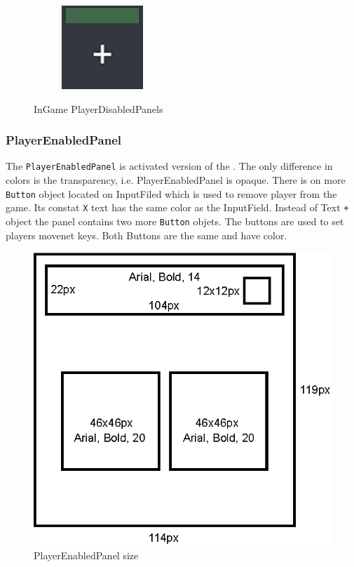 \begin{figure}[h!]
\begin{subfigure}{0.185\textwidth}
	\end{subfigure}
	\begin{subfigure}{0.185\textwidth}
		\centering
		\includegraphics[scale=1, frame]{gui-imgs/player6disabledpanel}
	\end{subfigure}
	\caption{InGame PlayerDisabledPanels}
\end{figure}

\subsubsection{PlayerEnabledPanel}\label{gui-playerenabledpanel}
\noindent The \verb|PlayerEnabledPanel| is activated version of the . The only difference in colors is the transparency, i.e. PlayerEnabledPanel is opaque. There is on more \verb|Button| object located on InputFiled which is used to remove player from the game. Its constat \verb|X| text has the same color as the InputField. Instead of Text \verb|+| object the panel contains two more \verb|Button| objets. The buttons are used to set players movenet keys. Both Buttons are the same and have  color.
\newpage

\begin{figure}[h!]
	\centering
	\includegraphics[scale=1]{gui-imgs/playerenabledpanel-size}
	\caption{PlayerEnabledPanel size}
\end{figure}


